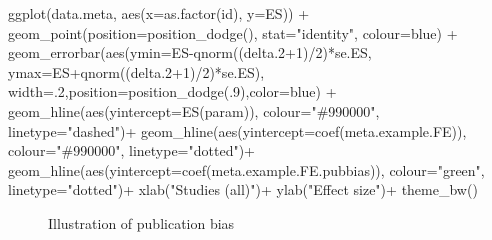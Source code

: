 \documentclass[
]{book}
\newenvironment{Shaded}{\begin{snugshade}}{\end{snugshade}}
\newcommand{\AttributeTok}[1]{\textcolor[rgb]{0.77,0.63,0.00}{#1}}
\newcommand{\DecValTok}[1]{\textcolor[rgb]{0.00,0.00,0.81}{#1}}
\newcommand{\FloatTok}[1]{\textcolor[rgb]{0.00,0.00,0.81}{#1}}
\newcommand{\FunctionTok}[1]{\textcolor[rgb]{0.00,0.00,0.00}{#1}}
\newcommand{\NormalTok}[1]{#1}
\newcommand{\SpecialCharTok}[1]{\textcolor[rgb]{0.00,0.00,0.00}{#1}}
\newcommand{\StringTok}[1]{\textcolor[rgb]{0.31,0.60,0.02}{#1}}
\theoremstyle{definition}
\theoremstyle{definition}
\theoremstyle{definition}
\theoremstyle{definition}
\theoremstyle{remark}
\begin{document}
\begin{Shaded}
\begin{Highlighting}[]
  \FunctionTok{ggplot}\NormalTok{(data.meta, }\FunctionTok{aes}\NormalTok{(}\AttributeTok{x=}\FunctionTok{as.factor}\NormalTok{(id), }\AttributeTok{y=}\NormalTok{ES)) }\SpecialCharTok{+}
      \FunctionTok{geom\_point}\NormalTok{(}\AttributeTok{position=}\FunctionTok{position\_dodge}\NormalTok{(), }\AttributeTok{stat=}\StringTok{"identity"}\NormalTok{, }\AttributeTok{colour=}\StringTok{\textquotesingle{}blue\textquotesingle{}}\NormalTok{) }\SpecialCharTok{+}
      \FunctionTok{geom\_errorbar}\NormalTok{(}\FunctionTok{aes}\NormalTok{(}\AttributeTok{ymin=}\NormalTok{ES}\SpecialCharTok{{-}}\FunctionTok{qnorm}\NormalTok{((delta}\FloatTok{.2}\SpecialCharTok{+}\DecValTok{1}\NormalTok{)}\SpecialCharTok{/}\DecValTok{2}\NormalTok{)}\SpecialCharTok{*}\NormalTok{se.ES, }\AttributeTok{ymax=}\NormalTok{ES}\SpecialCharTok{+}\FunctionTok{qnorm}\NormalTok{((delta}\FloatTok{.2}\SpecialCharTok{+}\DecValTok{1}\NormalTok{)}\SpecialCharTok{/}\DecValTok{2}\NormalTok{)}\SpecialCharTok{*}\NormalTok{se.ES), }\AttributeTok{width=}\NormalTok{.}\DecValTok{2}\NormalTok{,}\AttributeTok{position=}\FunctionTok{position\_dodge}\NormalTok{(.}\DecValTok{9}\NormalTok{),}\AttributeTok{color=}\StringTok{\textquotesingle{}blue\textquotesingle{}}\NormalTok{) }\SpecialCharTok{+}
      \FunctionTok{geom\_hline}\NormalTok{(}\FunctionTok{aes}\NormalTok{(}\AttributeTok{yintercept=}\FunctionTok{ES}\NormalTok{(param)), }\AttributeTok{colour=}\StringTok{"\#990000"}\NormalTok{, }\AttributeTok{linetype=}\StringTok{"dashed"}\NormalTok{)}\SpecialCharTok{+}
      \FunctionTok{geom\_hline}\NormalTok{(}\FunctionTok{aes}\NormalTok{(}\AttributeTok{yintercept=}\FunctionTok{coef}\NormalTok{(meta.example.FE)), }\AttributeTok{colour=}\StringTok{"\#990000"}\NormalTok{, }\AttributeTok{linetype=}\StringTok{"dotted"}\NormalTok{)}\SpecialCharTok{+}
      \FunctionTok{geom\_hline}\NormalTok{(}\FunctionTok{aes}\NormalTok{(}\AttributeTok{yintercept=}\FunctionTok{coef}\NormalTok{(meta.example.FE.pubbias)), }\AttributeTok{colour=}\StringTok{"green"}\NormalTok{, }\AttributeTok{linetype=}\StringTok{"dotted"}\NormalTok{)}\SpecialCharTok{+}
      \FunctionTok{xlab}\NormalTok{(}\StringTok{"Studies (all)"}\NormalTok{)}\SpecialCharTok{+}
      \FunctionTok{ylab}\NormalTok{(}\StringTok{"Effect size"}\NormalTok{)}\SpecialCharTok{+}
      \FunctionTok{theme\_bw}\NormalTok{()}
\end{Highlighting}
\end{Shaded}

\begin{figure}[htbp]

{\centering {}

}

\caption{Illustration of publication bias}\label{fig:PubBias}
\end{figure}
\end{document}
